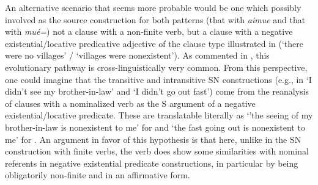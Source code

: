 \documentclass[output=paper,draft,draftmode,colorlinks,citecolor=brown]{langscibook}
\begin{document}
An alternative scenario that seems more probable would be one
which possibly involved as the source construction for both patterns (that
with \textit{aimue} and that with \textit{mué=}) not a clause with a
non-finite verb, but a clause with a negative existential\slash locative
predicative adjective of the clause type illustrated in
 (`there were no villages' / `villages were nonexistent'). As commented in , this evolutionary
pathway is cross-linguistically very common. From this perspective, one
could imagine that the transitive and intransitive SN constructions (e.g.,
in  `I didn't see my brother-in-law' and
 `I didn't go out fast') come from the reanalysis
of clauses with a nominalized verb as the S argument of a negative
existential\slash locative predicate. These are translatable literally as `'the seeing of my brother-in-law is nonexistent to me' for  and
`the fast going out is nonexistent to me' for . An argument in favor of this hypothesis is that here, unlike
in the SN construction with finite verbs, the verb does show some
similarities with nominal referents in negative existential predicate
constructions, in particular by being obligatorily non-finite and in an
affirmative form.
\end{document}
